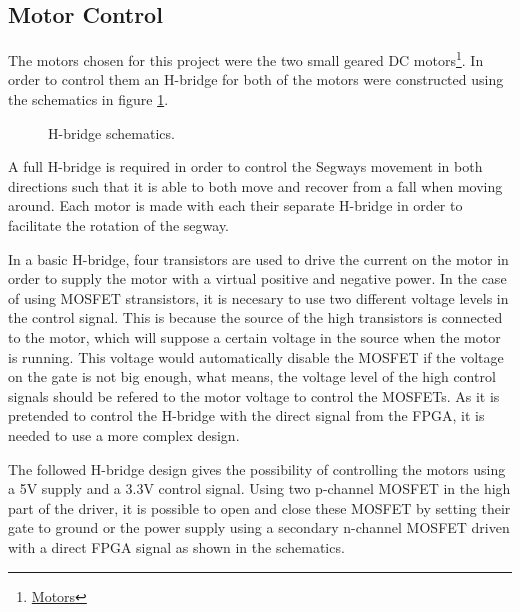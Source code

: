 
\subsection{Motor Control}
The motors chosen for this project were the two small geared DC motors\footnote{ \href{https://www.sparkfun.com/products/13258}{Motors}}.
In order to control them an H-bridge for both of the motors were constructed using the schematics in figure \ref{fig:hbridge}.


\begin{figure}[H]
\centering

\caption{H-bridge schematics.}
\label{fig:hbridge}
\end{figure}

A full H-bridge is required in order to control the Segways movement in both directions such that it is able to both move and recover from a fall when moving around.
Each motor is made with each their separate H-bridge in order to facilitate the rotation of the segway.

In a basic H-bridge, four transistors are used to drive the current on the motor in order to supply the motor with a virtual positive and negative power.
In the case of using MOSFET stransistors, it is necesary to use two different voltage levels in the control signal.
This is because the source of the high transistors is connected to the motor, which will suppose a certain voltage in the source when the motor is running.
This voltage would automatically disable the MOSFET if the voltage on the gate is not big enough, what means, the voltage level of the high control signals should be refered to the motor voltage to control the MOSFETs.
As it is pretended to control the H-bridge with the direct signal from the FPGA, it is needed to use a more complex design.

The followed H-bridge design gives the possibility of controlling the motors using a 5V supply and a 3.3V control signal.
Using two p-channel MOSFET in the high part of the driver, it is possible to open and close these MOSFET by setting their gate to ground or the power supply using a secondary n-channel MOSFET driven with a direct FPGA signal as shown in the schematics.


